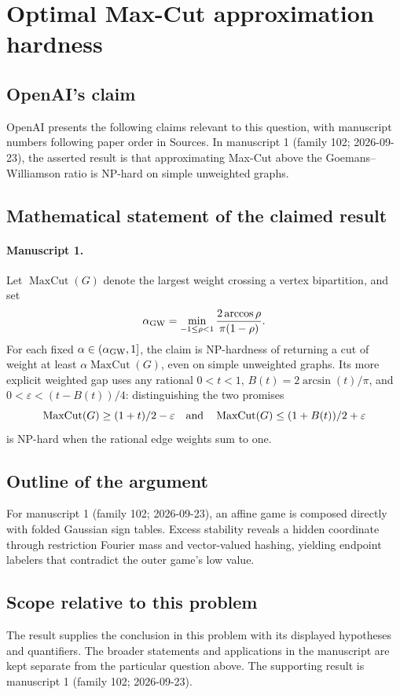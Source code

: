 \documentclass[11pt]{article}
\begin{document}
\section*{Optimal Max-Cut approximation hardness}

\subsection{OpenAI's claim}
OpenAI presents the following claims relevant to this question, with manuscript numbers following paper order in Sources. In manuscript 1 (family 102; 2026-09-23), the asserted result is that approximating Max-Cut above the Goemans--Williamson ratio is NP-hard on simple unweighted graphs.

\subsection{Mathematical statement of the claimed result}
\paragraph{Manuscript 1.}
Let $\operatorname{MaxCut}(G)$ denote the largest weight crossing a vertex bipartition, and set
\[
 \alpha_{\rm GW}=\min_{-1\le\rho<1}\frac{2\arccos\rho}{\pi(1-\rho)}.
\]
For each fixed $\alpha\in(\alpha_{\rm GW},1]$, the claim is NP-hardness of returning a cut of weight at least $\alpha\operatorname{MaxCut}(G)$, even on simple unweighted graphs. Its more explicit weighted gap uses any rational $0<t<1$, $B(t)=2\arcsin(t)/\pi$, and $0<\varepsilon<(t-B(t))/4$: distinguishing the two promises
\[
 \operatorname{MaxCut}(G)\ge(1+t)/2-\varepsilon
 \quad\hbox{and}\quad
 \operatorname{MaxCut}(G)\le(1+B(t))/2+\varepsilon
\]
is NP-hard when the rational edge weights sum to one.

\subsection{Outline of the argument}
For manuscript 1 (family 102; 2026-09-23), an affine game is composed directly with folded Gaussian sign tables. Excess stability reveals a hidden coordinate through restriction Fourier mass and vector-valued hashing, yielding endpoint labelers that contradict the outer game's low value.

\subsection{Scope relative to this problem}
The result supplies the conclusion in this problem with its displayed hypotheses and quantifiers. The broader statements and applications in the manuscript are kept separate from the particular question above. The supporting result is manuscript 1 (family 102; 2026-09-23).
\end{document}
